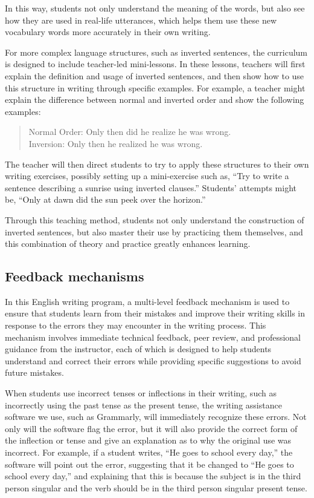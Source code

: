 \documentclass[11pt]{article}
\begin{document}
In this way, students not only understand the meaning of the words, but also see how they are used in real-life utterances, which helps them use these new vocabulary words more accurately in their own writing.

For more complex language structures, such as inverted sentences, the curriculum is designed to include teacher-led mini-lessons. In these lessons, teachers will first explain the definition and usage of inverted sentences, and then show how to use this structure in writing through specific examples. For example, a teacher might explain the difference between normal and inverted order and show the following examples:

\begin{quote}
Normal Order: Only then did he realize he was wrong. \\
Inversion: Only then he realized he was wrong.
\end{quote}

The teacher will then direct students to try to apply these structures to their own writing exercises, possibly setting up a mini-exercise such as, ``Try to write a sentence describing a sunrise using inverted clauses.'' Students' attempts might be, ``Only at dawn did the sun peek over the horizon.''

Through this teaching method, students not only understand the construction of inverted sentences, but also master their use by practicing them themselves, and this combination of theory and practice greatly enhances learning.

\subsection{Feedback mechanisms}

In this English writing program, a multi-level feedback mechanism is used to ensure that students learn from their mistakes and improve their writing skills in response to the errors they may encounter in the writing process. This mechanism involves immediate technical feedback, peer review, and professional guidance from the instructor, each of which is designed to help students understand and correct their errors while providing specific suggestions to avoid future mistakes.

When students use incorrect tenses or inflections in their writing, such as incorrectly using the past tense as the present tense, the writing assistance software we use, such as Grammarly, will immediately recognize these errors. Not only will the software flag the error, but it will also provide the correct form of the inflection or tense and give an explanation as to why the original use was incorrect. For example, if a student writes, ``He goes to school every day,'' the software will point out the error, suggesting that it be changed to ``He goes to school every day,'' and explaining that this is because the subject is in the third person singular and the verb should be in the third person singular present tense.
\end{document}
